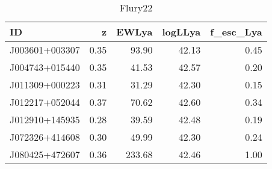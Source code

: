 \begin{table}[H]
\caption{Flury22}
\label{Flury22}
\begin{tabular}{lrrrr}
\toprule
ID & z & EWLya & logLLya & f_esc_Lya \\
\midrule
J003601+003307 & 0.35 & 93.90 & 42.13 & 0.45 \\
J004743+015440 & 0.35 & 41.53 & 42.57 & 0.20 \\
J011309+000223 & 0.31 & 31.29 & 42.30 & 0.15 \\
J012217+052044 & 0.37 & 70.62 & 42.60 & 0.34 \\
J012910+145935 & 0.28 & 39.59 & 42.48 & 0.19 \\
J072326+414608 & 0.30 & 49.99 & 42.30 & 0.24 \\
J080425+472607 & 0.36 & 233.68 & 42.46 & 1.00 \\
\bottomrule
\end{tabular}
\end{table}
